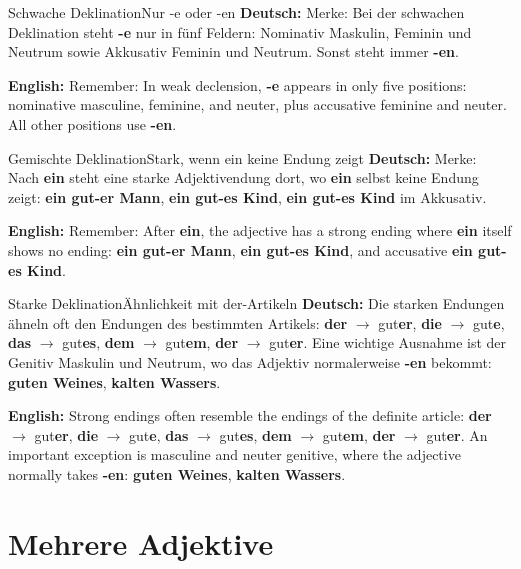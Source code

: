 \documentclass[a4paper,11pt]{article}
\newcommand{\GermanText}[1]{\textbf{Deutsch: }#1\par}
\newcommand{\EnglishText}[1]{{\small\color{SoftGray}\textbf{English: }#1\par}}
\begin{document}
        \begin{grammarentry}{Schwache Deklination}{Nur -e oder -en}
            \GermanText{Merke: Bei der schwachen Deklination steht \textbf{-e} nur in fünf Feldern: Nominativ Maskulin, Feminin und Neutrum sowie Akkusativ Feminin und Neutrum. Sonst steht immer \textbf{-en}.}
            \EnglishText{Remember: In weak declension, \textbf{-e} appears in only five positions: nominative masculine, feminine, and neuter, plus accusative feminine and neuter. All other positions use \textbf{-en}.}
        \end{grammarentry}

        \begin{grammarentry}{Gemischte Deklination}{Stark, wenn ein keine Endung zeigt}
            \GermanText{Merke: Nach \textbf{ein} steht eine starke Adjektivendung dort, wo \textbf{ein} selbst keine Endung zeigt: \textbf{ein gut-er Mann}, \textbf{ein gut-es Kind}, \textbf{ein gut-es Kind} im Akkusativ.}
            \EnglishText{Remember: After \textbf{ein}, the adjective has a strong ending where \textbf{ein} itself shows no ending: \textbf{ein gut-er Mann}, \textbf{ein gut-es Kind}, and accusative \textbf{ein gut-es Kind}.}
        \end{grammarentry}

        \begin{grammarentry}{Starke Deklination}{Ähnlichkeit mit der-Artikeln}
            \GermanText{Die starken Endungen ähneln oft den Endungen des bestimmten Artikels: \textbf{der} $\rightarrow$ gut\textbf{er}, \textbf{die} $\rightarrow$ gut\textbf{e}, \textbf{das} $\rightarrow$ gut\textbf{es}, \textbf{dem} $\rightarrow$ gut\textbf{em}, \textbf{der} $\rightarrow$ gut\textbf{er}. Eine wichtige Ausnahme ist der Genitiv Maskulin und Neutrum, wo das Adjektiv normalerweise \textbf{-en} bekommt: \textbf{guten Weines}, \textbf{kalten Wassers}.}
            \EnglishText{Strong endings often resemble the endings of the definite article: \textbf{der} $\rightarrow$ gut\textbf{er}, \textbf{die} $\rightarrow$ gut\textbf{e}, \textbf{das} $\rightarrow$ gut\textbf{es}, \textbf{dem} $\rightarrow$ gut\textbf{em}, \textbf{der} $\rightarrow$ gut\textbf{er}. An important exception is masculine and neuter genitive, where the adjective normally takes \textbf{-en}: \textbf{guten Weines}, \textbf{kalten Wassers}.}
        \end{grammarentry}

    \section{Mehrere Adjektive}
\end{document}
